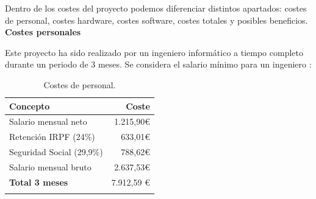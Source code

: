Dentro de los costes del proyecto podemos diferenciar distintos apartados: costes de personal, costes hardware, costes software, costes totales y posibles beneficios.\\

\textbf{Costes personales}

Este proyecto ha sido realizado por un ingeniero informático a tiempo completo durante un periodo de 3 meses. Se considera el salario mínimo para un ingeniero \cite{salariogob}:

\begin{longtable}[]{@{}lr@{}}
\toprule
\begin{minipage}[b]{0.38\columnwidth}\raggedright\strut
\textbf{Concepto}\strut
\end{minipage} & \begin{minipage}[b]{0.20\columnwidth}\raggedright\strut
\textbf{Coste}\strut
\end{minipage}\tabularnewline
\midrule
\endhead
\begin{minipage}[t]{0.38\columnwidth}\raggedright\strut
Salario mensual neto\strut
\end{minipage} & \begin{minipage}[t]{0.20\columnwidth}\raggedright\strut
1.215,90\euro{}\strut
\end{minipage}\tabularnewline
\begin{minipage}[t]{0.38\columnwidth}\raggedright\strut
Retención IRPF (24\%)\strut
\end{minipage} & \begin{minipage}[t]{0.20\columnwidth}\raggedright\strut
633,01\euro{}\strut
\end{minipage}\tabularnewline
\begin{minipage}[t]{0.38\columnwidth}\raggedright\strut
Seguridad Social (29,9\%)\strut
\end{minipage} & \begin{minipage}[t]{0.20\columnwidth}\raggedright\strut
788,62\euro{}\strut
\end{minipage}\tabularnewline
\begin{minipage}[t]{0.38\columnwidth}\raggedright\strut
Salario mensual bruto\strut
\end{minipage} & \begin{minipage}[t]{0.20\columnwidth}\raggedright\strut
2.637,53\euro{}\strut
\end{minipage}\tabularnewline
\midrule
\begin{minipage}[t]{0.38\columnwidth}\raggedright\strut
\textbf{Total 3 meses}\strut
\end{minipage} & \begin{minipage}[t]{0.20\columnwidth}\raggedright\strut
7.912,59 \euro{}\strut
\end{minipage}\tabularnewline
\bottomrule
\caption{Costes de personal.}
\end{longtable}

